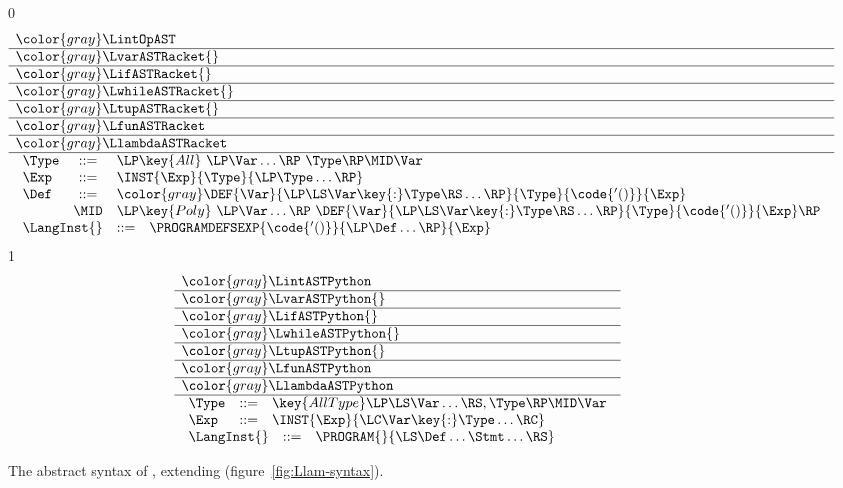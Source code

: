 \documentclass[7x10]{TimesAPriori_MIT}%
\newcommand{\gray}[1]{{\color{gray} #1}}
\def\racketEd{0}
\def\pythonEd{1}
\providecommand{\BookEdition}{1}
\let\edition\BookEdition
\newcommand{\pythonColor}[0]{}
\numberwithin{theorem}{chapter}
\numberwithin{definition}{chapter}
\numberwithin{equation}{chapter}
\begin{document}
\newcommand{\LinstASTRacket}{
\begin{array}{lcl}
  \Type &::=& \LP\key{All}~\LP\Var\ldots\RP~ \Type\RP \MID \Var \\
  \Exp &::=& \INST{\Exp}{\Type}{\LP\Type\ldots\RP} \\
  \Def &::=& \gray{ \DEF{\Var}{\LP\LS\Var \key{:} \Type\RS \ldots\RP}{\Type}{\code{'()}}{\Exp} } \\
   &\MID& \LP\key{Poly}~\LP\Var\ldots\RP~ \DEF{\Var}{\LP\LS\Var \key{:} \Type\RS \ldots\RP}{\Type}{\code{'()}}{\Exp}\RP 
\end{array}
}  

\newcommand{\LinstASTPython}{
\begin{array}{lcl}
  \Type &::=& \key{AllType}\LP\LS\Var\ldots\RS, \Type\RP \MID \Var \\
  \Exp &::=& \INST{\Exp}{\LC\Var\key{:}\Type\ldots\RC} 
\end{array}
}

\begin{figure}[tp]
\centering
\begin{tcolorbox}[colback=white]
\small
{\if\edition\racketEd
\[
\begin{array}{l}
  \gray{\LintOpAST} \\ \hline
  \gray{\LvarASTRacket{}} \\ \hline
  \gray{\LifASTRacket{}} \\ \hline
  \gray{\LwhileASTRacket{}} \\ \hline
  \gray{\LtupASTRacket{}} \\ \hline
  \gray{\LfunASTRacket} \\ \hline
  \gray{\LlambdaASTRacket} \\ \hline
  \LinstASTRacket \\
\begin{array}{lcl}
  \LangInst{} &::=& \PROGRAMDEFSEXP{\code{'()}}{\LP\Def\ldots\RP}{\Exp}
\end{array}
\end{array}
\]
\fi}
{\if\edition\pythonEd\pythonColor
\[
\begin{array}{l}
  \gray{\LintASTPython} \\ \hline
  \gray{\LvarASTPython{}} \\ \hline
  \gray{\LifASTPython{}} \\ \hline
  \gray{\LwhileASTPython{}} \\ \hline
  \gray{\LtupASTPython{}} \\ \hline
  \gray{\LfunASTPython} \\ \hline
  \gray{\LlambdaASTPython} \\ \hline
  \LinstASTPython \\
  \begin{array}{lcl}
  \LangInst{} &::=& \PROGRAM{}{\LS \Def \ldots \Stmt \ldots \RS}
  \end{array}
\end{array}
\]
\fi}
\end{tcolorbox}

\caption{The abstract syntax of \LangInst{}, extending \LangLam{}
    (figure~\ref{fig:Llam-syntax}).}
\label{fig:Lpoly-prime-syntax}
\end{figure}
\end{document}
